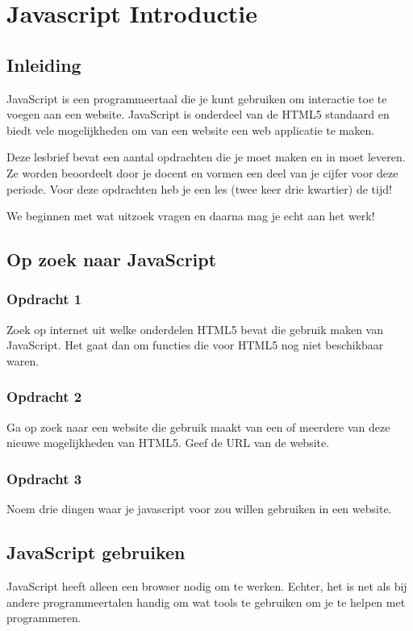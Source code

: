 \documentclass[a4paper]{report}
\begin{document}
\chapter*{\textcolor{seccol}{Javascript} Introductie}

\section*{Inleiding}
JavaScript is een programmeertaal die je kunt gebruiken om interactie toe te voegen aan een website. JavaScript is onderdeel van de HTML5 standaard en biedt vele mogelijkheden om van een website een web applicatie te maken.

Deze lesbrief bevat een aantal opdrachten die je moet maken en in moet leveren. Ze worden beoordeelt door je docent en vormen een deel van je cijfer voor deze periode. Voor deze opdrachten heb je een les (twee keer drie kwartier) de tijd!

We beginnen met wat uitzoek vragen en daarna mag je echt aan het werk!

\section*{Op zoek naar JavaScript}

\subsection*{Opdracht 1}
Zoek op internet uit welke onderdelen HTML5 bevat die gebruik maken van JavaScript. Het gaat dan om functies die voor HTML5 nog niet beschikbaar waren.

\subsection*{Opdracht 2}
Ga op zoek naar een website die gebruik maakt van een of meerdere van deze nieuwe mogelijkheden van HTML5. Geef de URL van de website.

\subsection*{Opdracht 3}
Noem drie dingen waar je javascript voor zou willen gebruiken in een website.

\section*{JavaScript gebruiken}
JavaScript heeft alleen een browser nodig om te werken. Echter, het is net als bij andere programmeertalen handig om wat tools te gebruiken om je te helpen met programmeren.
\end{document}
